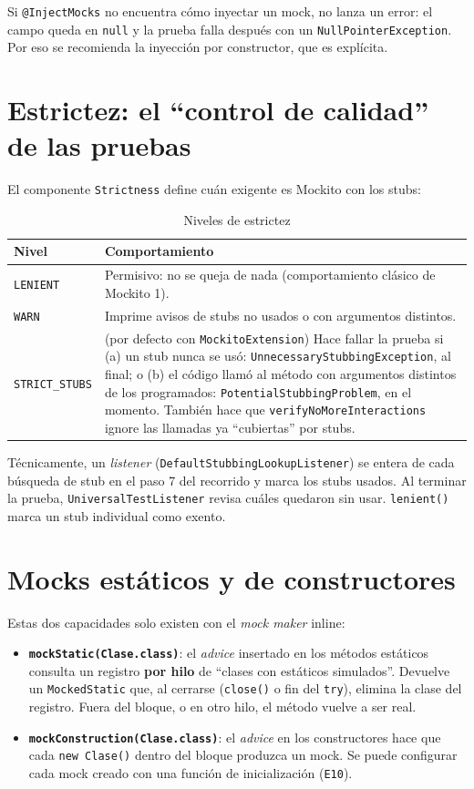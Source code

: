 \documentclass[11pt,a4paper,oneside]{report}
\newcommand{\code}[1]{\texttt{#1}}
\begin{document}
\begin{atencion}
Si \code{@InjectMocks} no encuentra cómo inyectar un mock, no lanza un error: el campo queda en \code{null} y la prueba falla después con un \code{NullPointerException}. Por eso se recomienda la inyección por constructor, que es explícita.
\end{atencion}

\section{Estrictez: el ``control de calidad'' de las pruebas}
El componente \code{Strictness} define cuán exigente es Mockito con los stubs:

\begin{table}[H]
\centering
\caption{Niveles de estrictez}
\begin{tabularx}{\linewidth}{lX}
\toprule
\textbf{Nivel} & \textbf{Comportamiento}\\
\midrule
\code{LENIENT} & Permisivo: no se queja de nada (comportamiento clásico de Mockito 1).\\
\code{WARN} & Imprime avisos de stubs no usados o con argumentos distintos.\\
\code{STRICT\_STUBS} & (por defecto con \code{MockitoExtension}) Hace fallar la prueba si (a) un stub nunca se usó: \code{UnnecessaryStubbingException}, al final; o (b) el código llamó al método con argumentos distintos de los programados: \code{PotentialStubbingProblem}, en el momento. También hace que \code{verifyNoMoreInteractions} ignore las llamadas ya ``cubiertas'' por stubs.\\
\bottomrule
\end{tabularx}
\end{table}

Técnicamente, un \emph{listener} (\code{DefaultStubbingLookupListener}) se entera de cada búsqueda de stub en el paso 7 del recorrido y marca los stubs usados. Al terminar la prueba, \code{UniversalTestListener} revisa cuáles quedaron sin usar. \code{lenient()} marca un stub individual como exento.

\section{Mocks estáticos y de constructores}
Estas dos capacidades solo existen con el \emph{mock maker} inline:
\begin{itemize}
  \item \textbf{\code{mockStatic(Clase.class)}}: el \emph{advice} insertado en los métodos estáticos consulta un registro \textbf{por hilo} de ``clases con estáticos simulados''. Devuelve un \code{MockedStatic} que, al cerrarse (\code{close()} o fin del \code{try}), elimina la clase del registro. Fuera del bloque, o en otro hilo, el método vuelve a ser real.
  \item \textbf{\code{mockConstruction(Clase.class)}}: el \emph{advice} en los constructores hace que cada \code{new Clase()} dentro del bloque produzca un mock. Se puede configurar cada mock creado con una función de inicialización (\code{E10}).
\end{itemize}
\end{document}
